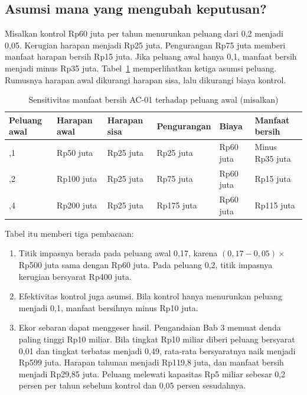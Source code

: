 \subsection*{Asumsi mana yang mengubah keputusan?}

Misalkan kontrol Rp60 juta per tahun menurunkan peluang dari 0,2 menjadi 0,05. Kerugian harapan menjadi
Rp25 juta. Pengurangan Rp75 juta memberi manfaat harapan bersih Rp15 juta. Jika peluang awal hanya 0,1,
manfaat bersih menjadi minus Rp35 juta. Tabel~\ref{tab:ch05-sensitivitas} memperlihatkan ketiga asumsi
peluang. Rumusnya harapan awal dikurangi harapan sisa, lalu dikurangi biaya kontrol.

\begin{table}[!htb]
  \centering\footnotesize
  \caption{Sensitivitas manfaat bersih AC-01 terhadap peluang awal (misalkan)}
  \label{tab:ch05-sensitivitas}
  \begin{tabularx}{\textwidth}{|>{\raggedright\arraybackslash}p{}|>{\raggedright\arraybackslash}X|>{\raggedright\arraybackslash}X|>{\raggedright\arraybackslash}X|>{\raggedright\arraybackslash}X|>{\raggedright\arraybackslash}X|}
    \hline
    \textbf{Peluang awal} & \textbf{Harapan awal} & \textbf{Harapan sisa} & \textbf{Pengurangan} &
    \textbf{Biaya} & \textbf{Manfaat bersih} \\ \hline
    0,1 & Rp50 juta & Rp25 juta & Rp25 juta & Rp60 juta & Minus Rp35 juta \\ \hline
    0,2 & Rp100 juta & Rp25 juta & Rp75 juta & Rp60 juta & Rp15 juta \\ \hline
    0,4 & Rp200 juta & Rp25 juta & Rp175 juta & Rp60 juta & Rp115 juta \\ \hline
  \end{tabularx}
\end{table}

Tabel itu memberi tiga pembacaan:
\begin{enumerate}
  \item Titik impasnya berada pada peluang awal 0,17, karena $(0{,}17 - 0{,}05) \times$ Rp500 juta sama
  dengan Rp60 juta. Pada peluang 0,2, titik impasnya kerugian bersyarat Rp400 juta.
  \item Efektivitas kontrol juga asumsi. Bila kontrol hanya menurunkan peluang menjadi 0,1, manfaat
  bersihnya minus Rp10 juta.
  \item Ekor sebaran dapat menggeser hasil. Pengandaian Bab 3 memuat denda paling tinggi Rp10 miliar.
  Bila tingkat Rp10 miliar diberi peluang bersyarat 0,01 dan tingkat terbatas menjadi 0,49, rata-rata
  bersyaratnya naik menjadi Rp599 juta. Harapan tahunan menjadi Rp119,8 juta, dan manfaat bersih
  menjadi Rp29,85 juta. Peluang melewati kapasitas Rp5 miliar sebesar 0,2 persen per tahun sebelum
  kontrol dan 0,05 persen sesudahnya.
\end{enumerate}

